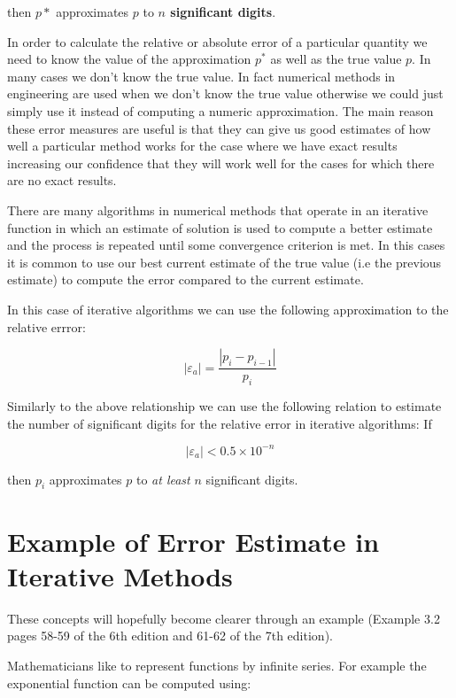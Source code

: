 \documentclass [titlepage,12pt,letter] {article}
\begin{document}
\noindent 
then $p*$ approximates $p$ to {\bf $n$ significant digits}. 

In order to calculate the relative or absolute error of a particular
quantity we need to know the value of the approximation $p^*$ as well
as the true value $p$. In many cases we don't know the true value. 
In fact numerical methods in engineering are used when we don't know
the true value otherwise we could just simply use it instead of
computing a numeric approximation. The main reason these error
measures are useful is that they can give us good estimates of how
well a particular method works for the case where we have exact
results increasing our confidence that they will work well for the
cases for which there are no exact results. 

There are many algorithms in numerical methods that operate in an
iterative function in which an estimate of solution is used to compute 
a better estimate and the process is repeated until some convergence
criterion is met. In this cases it is common to use our best current
estimate of the true value (i.e the previous estimate) to compute the
error compared to the current estimate. 

In this case of iterative algorithms we can use the following
approximation to the relative errror: 

\begin{equation} 
|\varepsilon_{a}| = \frac{|p_i - p_{i-1}|}{p_{i}} 
\end{equation} 

Similarly to the above relationship we can use the following relation to estimate the number of
significant digits for the relative error in iterative algorithms: If

\begin{equation} 
|\varepsilon_{a}| < 0.5 \times 10^{-n}
\end{equation} 

\noindent
then $p_i$ approximates $p$ to {\it at least} $n$ significant digits.

\section{Example of Error Estimate in Iterative Methods} 

These concepts will hopefully become clearer through an example
(Example 3.2 pages 58-59 of the 6th edition and 61-62 of the 7th
edition). 

Mathematicians like to represent functions by infinite series. For
example the exponential function can be computed using: 
\end{document}
